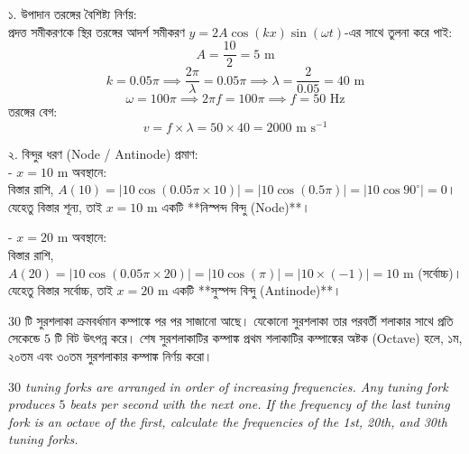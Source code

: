 \documentclass[12pt, a4paper]{article}
\begin{document}
\vspace{1em}

\begin{tcolorbox}[solutionbox={সমাধান (Solution)}]
\noindent
১. উপাদান তরঙ্গের বৈশিষ্ট্য নির্ণয়: \\
প্রদত্ত সমীকরণকে স্থির তরঙ্গের আদর্শ সমীকরণ $y = 2A \cos(kx) \sin(\omega t)$-এর সাথে তুলনা করে পাই:
\[ A = \frac{10}{2} = 5\text{ m} \]
\[ k = 0.05\pi \implies \frac{2\pi}{\lambda} = 0.05\pi \implies \lambda = \frac{2}{0.05} = 40\text{ m} \]
\[ \omega = 100\pi \implies 2\pi f = 100\pi \implies f = 50\text{ Hz} \]
তরঙ্গের বেগ:
\[ v = f \times \lambda = 50 \times 40 = 2000\text{ m s}^{-1} \]

\noindent
২. বিন্দুর ধরণ (Node / Antinode) প্রমাণ: \\
- $x = 10\text{ m}$ অবস্থানে: \\
বিস্তার রাশি, $A(10) = |10 \cos(0.05\pi \times 10)| = |10 \cos(0.5\pi)| = |10 \cos 90^\circ| = 0$। \\
যেহেতু বিস্তার শূন্য, তাই $x = 10\text{ m}$ একটি **নিস্পন্দ বিন্দু (Node)**।

\vspace{0.3em}
\noindent
- $x = 20\text{ m}$ অবস্থানে: \\
বিস্তার রাশি, $A(20) = |10 \cos(0.05\pi \times 20)| = |10 \cos(\pi)| = |10 \times (-1)| = 10\text{ m}$ (সর্বোচ্চ)। \\
যেহেতু বিস্তার সর্বোচ্চ, তাই $x = 20\text{ m}$ একটি **সুস্পন্দ বিন্দু (Antinode)**।
\end{tcolorbox}
\begin{tcolorbox}[questionbox={প্রশ্ন (Question) 5}]
\noindent
$30$ টি সুরশলাকা ক্রমবর্ধমান কম্পাঙ্কে পর পর সাজানো আছে। যেকোনো সুরশলাকা তার পরবর্তী শলাকার সাথে প্রতি সেকেন্ডে $5$ টি বিট উৎপন্ন করে। শেষ সুরশলাকাটির কম্পাঙ্ক প্রথম শলাকাটির কম্পাঙ্কের অষ্টক (Octave) হলে, ১ম, ২০তম এবং ৩০তম সুরশলাকার কম্পাঙ্ক নির্ণয় করো।

\vspace{0.8em}
\begin{english}
\noindent\textit{\color{darkgray}
$30$ tuning forks are arranged in order of increasing frequencies. Any tuning fork produces $5$ beats per second with the next one. If the frequency of the last tuning fork is an octave of the first, calculate the frequencies of the 1st, 20th, and 30th tuning forks.
}
\end{english}
\end{tcolorbox}
\end{document}
